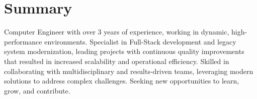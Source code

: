 \section{Summary}
	Computer Engineer with over 3 years of experience, working in dynamic, high-performance environments. Specialist in Full-Stack development and legacy system modernization, leading projects with continuous quality improvements that resulted in increased scalability and operational efficiency. Skilled in collaborating with multidisciplinary and results-driven teams, leveraging modern solutions to address complex challenges. Seeking new opportunities to learn, grow, and contribute.